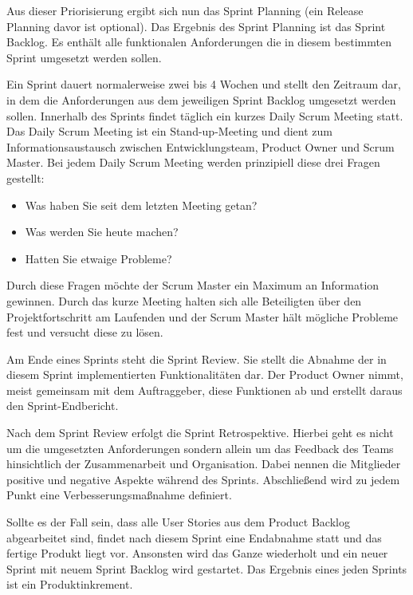 \newpage

Aus dieser Priorisierung ergibt sich nun das Sprint Planning (ein Release Planning davor ist optional). Das Ergebnis des Sprint Planning ist das Sprint Backlog. Es enthält alle funktionalen Anforderungen die in diesem bestimmten Sprint umgesetzt werden sollen.

Ein Sprint dauert normalerweise zwei bis 4 Wochen und stellt den Zeitraum dar, in dem die Anforderungen aus dem jeweiligen Sprint Backlog umgesetzt werden sollen. Innerhalb des Sprints findet täglich ein kurzes Daily Scrum Meeting statt. Das Daily Scrum Meeting ist ein Stand-up-Meeting und dient zum Informationsaustausch zwischen Entwicklungsteam, Product Owner und Scrum Master. Bei jedem Daily Scrum Meeting werden prinzipiell diese drei Fragen gestellt:
\begin{itemize}
\item Was haben Sie seit dem letzten Meeting getan?
\item Was werden Sie heute machen?
\item Hatten Sie etwaige Probleme?
\end{itemize}

Durch diese Fragen möchte der Scrum Master ein Maximum an Information gewinnen. Durch das kurze Meeting halten sich alle Beteiligten über den Projektfortschritt am Laufenden und der Scrum Master hält mögliche Probleme fest und versucht diese zu lösen.

Am Ende eines Sprints steht die Sprint Review. Sie stellt die Abnahme der in diesem Sprint implementierten Funktionalitäten dar. Der Product Owner nimmt, meist gemeinsam mit dem Auftraggeber, diese Funktionen ab und erstellt daraus den Sprint-Endbericht.

Nach dem Sprint Review erfolgt die Sprint Retrospektive. Hierbei geht es nicht um die umgesetzten Anforderungen sondern allein um das Feedback des Teams hinsichtlich der Zusammenarbeit und Organisation. Dabei nennen die Mitglieder positive und negative Aspekte während des Sprints. Abschließend wird zu jedem Punkt eine Verbesserungsmaßnahme definiert.

Sollte es der Fall sein, dass alle User Stories aus dem Product Backlog abgearbeitet sind, findet nach diesem Sprint eine Endabnahme statt und das fertige Produkt liegt vor. Ansonsten wird das Ganze wiederholt und ein neuer Sprint mit neuem Sprint Backlog wird gestartet. Das Ergebnis eines jeden Sprints ist ein Produktinkrement.



